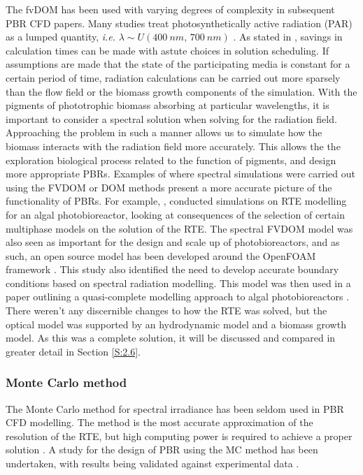 The fvDOM has been used with varying degrees of complexity in subsequent PBR CFD papers. Many studies treat photosynthetically active radiation (PAR) as a lumped quantity, \textit{i.e.} $\lambda \sim U(400\ nm ,\, 700\ nm)$
\cite{soman2015,pandey2015,wheaton2012,huang2011,eltayeb2010}. 
\skippingparagraph
As stated in \cite{krishnamoorthy2014}, savings in calculation times can be made with astute choices in solution scheduling. If assumptions are made that the state of the participating media is constant for a certain period of time, radiation calculations can be carried out more sparsely than the flow field or the biomass growth components of the simulation. With the pigments of phototrophic biomass absorbing at particular wavelengths, it is important to consider a spectral solution when solving for the radiation field. Approaching the problem in such a manner allows us to simulate how the biomass interacts with the radiation field more accurately. This allows the the exploration biological process related to the function of pigments, and design more appropriate PBRs. Examples of where spectral simulations were carried out using the FVDOM or DOM methods present a more accurate picture of the functionality of PBRs. For example, \cite{krishnamoorthy2014},  conducted simulations on RTE modelling for an algal photobioreactor, looking at consequences of the selection of certain multiphase models on the solution of the RTE. The spectral FVDOM model was also seen as important for the design and scale up of photobioreactors, and as such, an open source model has been developed around the OpenFOAM framework \cite{kong2014}. This study also identified the need to develop accurate boundary conditions based on spectral radiation modelling. This model was then used in a paper outlining a quasi-complete modelling approach to algal photobioreactors \cite{gao2016}. There weren't any discernible changes to how the RTE was solved, but the optical model was supported by an hydrodynamic model and a biomass growth model. As this was a complete solution, it will be discussed and compared in greater detail in Section \ref{S:2.6}. 
\skippingparagraph

\subsubsection{Monte Carlo method}
The Monte Carlo method for spectral irradiance has been seldom used in PBR CFD modelling. The method is the most accurate approximation of the resolution of the RTE, but high computing power is required to achieve a proper solution \cite{kong2014}. A study for the design of PBR using the MC method has been undertaken, with results being validated against experimental data \cite{heinrich2012}.

